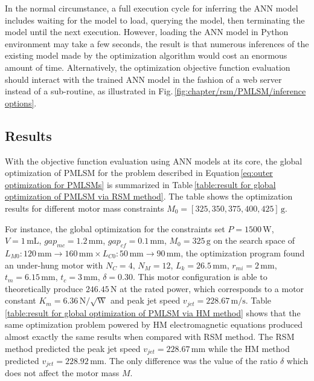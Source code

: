             
            In the normal circumstance, a full execution cycle for inferring the \acs{ANN} model includes waiting for the model to load, querying the model, then terminating the model until the next execution. However, loading the \acs{ANN} model in Python environment may take a few seconds, the result is that numerous inferences of the existing model made by the optimization algorithm would cost an enormous amount of time. Alternatively, the optimization objective function evaluation should interact with the trained \acs{ANN} model in the fashion of a web server instead of a sub-routine, as illustrated in Fig.\,\ref{fig:chapter/rsm/PMLSM/inference options}.


        \subsection{Results}                   \label{Chapter:RSM/PMLSM/Results}


            With the objective function evaluation using \acs{ANN} models at its core, the global optimization of \acs{PMLSM} for the problem described in Equation\,\ref{eq:outer optimization for PMLSMs} is summarized in Table\,\ref{table:result for global optimization of PMLSM via RSM method}. The table shows the optimization results for different motor mass constraints $M_0=[325,350,375,400,425]\,\mathrm{g}$.
            
            
            For instance, the global optimization for the constraints set $P=1500\,\mathrm{W}$, $V=1\,\mathrm{mL}$, $gap_{mc}=1.2\,\mathrm{mm}$, $gap_{cf}=0.1\,\mathrm{mm}$, $M_0=325\,\mathrm{g}$ on the search space of $L_{M0}:120\,\mathrm{mm}\rightarrow 160\,\mathrm{mm} \times L_{C0}:50\,\mathrm{mm}\rightarrow 90\,\mathrm{mm}$, the optimization program found an under-hung motor with $N_C=4$, $N_M=12$, $L_k=26.5\,\mathrm{mm}$, $r_{mi}=2\,\mathrm{mm}$, $t_m=6.15\,\mathrm{mm}$, $t_c=3\,\mathrm{mm}$, $\delta=0.30$. This motor configuration is able to theoretically produce $246.45\,\mathrm{N}$ at the rated power, which corresponds to a motor constant $K_m=6.36\,\mathrm{N/\sqrt{W}}$ and peak jet speed $v_{jet}=228.67\,\mathrm{m/s}$. Table\,\ref{table:result for global optimization of PMLSM via HM method} shows that the same optimization problem powered by \acs{HM} electromagnetic equations produced almost exactly the same results when compared with \acs{RSM} method. The \acs{RSM} method predicted the peak jet speed $v_{jet}=228.67\,\mathrm{mm}$ while the \acs{HM} method predicted $v_{jet}=228.92\,\mathrm{mm}$. The only difference was the value of the ratio $\delta$ which does not affect the motor mass $M$.  
            
